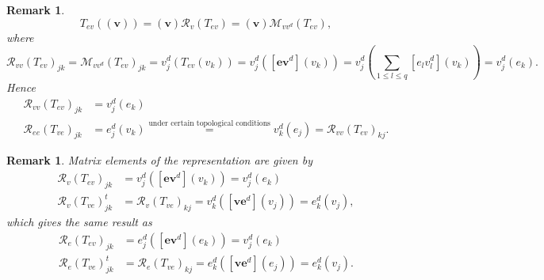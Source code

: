 \documentclass[aps,preprint]{revtex4}%
\newtheorem{remark}[theorem]{Remark}
\begin{document}
\begin{remark}%
\begin{equation}
T_{ev}\left(  \left(  \boldsymbol{v}\right)  \right)  =\left(  \boldsymbol{v}%
\right)  \mathcal{R}_{v}\left(  T_{ev}\right)  =\left(  \boldsymbol{v}\right)
\mathcal{M}_{vv^{d}}\left(  T_{ev}\right)  ,
\end{equation}
where
\begin{equation}
\mathcal{R}_{vv}\left(  T_{ev}\right)  _{jk}=\mathcal{M}_{vv^{d}}\left(
T_{ev}\right)  _{jk}=v_{j}^{d}\left(  T_{ev}\left(  v_{k}\right)  \right)
=v_{j}^{d}\left(  \left[  \mathbf{e}\boldsymbol{v}^{d}\right]  \left(
v_{k}\right)  \right)  =v_{j}^{d}\left(  \sum_{1\leq l\leq q}\left[
e_{l}v_{l}^{d}\right]  \left(  v_{k}\right)  \right)  =v_{j}^{d}\left(
e_{k}\right)  .
\end{equation}
Hence
\begin{align}
\mathcal{R}_{vv}\left(  T_{ev}\right)  _{jk}  &  =v_{j}^{d}\left(
e_{k}\right) \\
\mathcal{R}_{ee}\left(  T_{ve}\right)  _{jk}  &  =e_{j}^{d}\left(
v_{k}\right)  \overset{\text{under certain topological conditions}}{=}%
v_{k}^{d}\left(  e_{j}\right)  =\mathcal{R}_{vv}\left(  T_{ev}\right)  _{kj}.
\end{align}

\end{remark}

\begin{remark}
Matrix elements of the representation are given by
\begin{align}
\mathcal{R}_{v}\left(  T_{ev}\right)  _{jk}  &  =v_{j}^{d}\left(  \left[
\mathbf{e}\boldsymbol{v}^{d}\right]  \left(  v_{k}\right)  \right)  =v_{j}%
^{d}\left(  e_{k}\right) \\
\mathcal{R}_{v}\left(  T_{ve}\right)  _{jk}^{t}  &  =\mathcal{R}_{v}\left(
T_{ve}\right)  _{kj}=v_{k}^{d}\left(  \left[  \boldsymbol{v}\mathbf{e}%
^{d}\right]  \left(  v_{j}\right)  \right)  =e_{k}^{d}\left(  v_{j}\right)  ,
\end{align}
which gives the same result as
\begin{align}
\mathcal{R}_{e}\left(  T_{ev}\right)  _{jk}  &  =e_{j}^{d}\left(  \left[
\mathbf{e}\boldsymbol{v}^{d}\right]  \left(  e_{k}\right)  \right)  =v_{j}%
^{d}\left(  e_{k}\right) \\
\mathcal{R}_{e}\left(  T_{ve}\right)  _{jk}^{t}  &  =\mathcal{R}_{e}\left(
T_{ve}\right)  _{kj}=e_{k}^{d}\left(  \left[  \boldsymbol{v}\mathbf{e}%
^{d}\right]  \left(  e_{j}\right)  \right)  =e_{k}^{d}\left(  v_{j}\right)  .
\end{align}

\end{remark}
\end{document}

